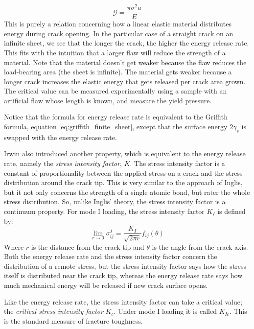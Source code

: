 \begin{equation}
	\mathcal{G} = \frac{\pi \sigma^2 a}{E}
\end{equation}
%
This is purely a relation concerning how a linear elastic material distributes energy during crack opening. In the particular case of a straight crack on an infinite sheet, we see that the longer the crack, the higher the energy release rate. This fits with the intuition that a larger flaw will reduce the strength of a material. Note that the material doesn't get weaker because the flaw reduces the load-bearing area (the sheet is infinite). The material gets weaker because a longer crack increases the elastic energy that gets released per crack area grown. The critical value can be measured experimentally using a sample with an artificial flaw whose length is known, and measure the yield pressure. 

Notice that the formula for energy release rate is equivalent to the Griffith formula, equation \ref{eq:griffith_finite_sheet}, except that the surface energy $2\gamma_s$ is swapped with the energy release rate.

Irwin also introduced another property, which is equivalent to the energy release rate, namely the \emph{stress intensity factor}, $K$. The stress intensity factor is a constant of proportionality between the applied stress on a crack and the stress distribution around the crack tip. This is very similar to the approach of Inglis, but it not only concerns the strength of a single atomic bond, but rater the whole stress distribution. So, unlike Inglis' theory, the stress intensity factor is a continuum property. For mode I loading, the stress intensity factor $K_I$ is defined by:
\begin{equation}
	\lim_{r \to 0} \sigma_{ij}^I = \frac{K_I}{\sqrt{2\pi r}} f_{ij}(\theta)
\end{equation}
Where $r$ is the distance from the crack tip and $\theta$ is the angle from the crack axis. Both the energy release rate and the stress intensity factor concern the distribution of a remote stress, but the stress intensity factor says how the stress itself is distributed near the crack tip, whereas the energy release rate says how much mechanical energy will be released if new crack surface opens. 

Like the energy release rate, the stress intensity factor can take a critical value; the \emph{critical stress intensity factor} $K_c$. Under mode I loading it is called $K_{Ic}$. This is the standard measure of fracture toughness.


